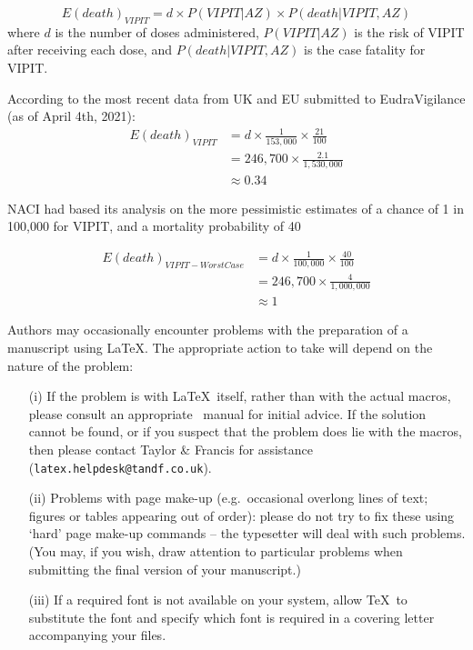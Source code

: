 $$
E(death)_{VIPIT}  = d \times P(VIPIT|AZ) \times P(death|VIPIT, AZ)
$$
where $d$ is the number of doses administered, $P(VIPIT|AZ)$ is the risk of VIPIT after receiving each dose, and $P(death|VIPIT, AZ)$ is the case fatality for VIPIT. 

According to the most recent data from UK and EU submitted to EudraVigilance (as of April 4th, 2021):
$$
\begin{aligned}
E(death)_{VIPIT} & = d \times \frac{1}{153,000} \times \frac{21}{100} \\
& = 246,700 \times \frac{2.1}{1,530,000} \\
& \approx 0.34
\end{aligned}
$$

NACI had based its analysis on the more pessimistic estimates of a chance of 1 in 100,000 for VIPIT, and a mortality probability of 40%

$$
\begin{aligned}
E(death)_{VIPIT-Worst Case} & = d \times \frac{1}{100,000} \times \frac{40}{100} \\
& = 246,700 \times \frac{4}{1,000,000} \\
& \approx 1
\end{aligned}
$$

Authors may occasionally encounter problems with the preparation of a manuscript using \LaTeX. The appropriate action to take will depend on the nature of the problem:
\begin{enumerate}
\item[(i)] If the problem is with \LaTeX\ itself, rather than with the actual macros, please consult an appropriate \LaTeXe\ manual for initial advice. If the solution cannot be found, or if you suspect that the problem does lie with the macros, then please contact Taylor \& Francis for assistance (\texttt{latex.helpdesk@tandf.co.uk}).
\item[(ii)] Problems with page make-up (e.g.\ occasional overlong lines of text; figures or tables appearing out of order): please do not try to fix these using `hard' page make-up commands -- the typesetter will deal with such problems. (You may, if you wish, draw attention to particular problems when submitting the final version of your manuscript.)
\item[(iii)] If a required font is not available on your system, allow \TeX\ to substitute the font and specify which font is required in a covering letter accompanying your files.
\end{enumerate}


